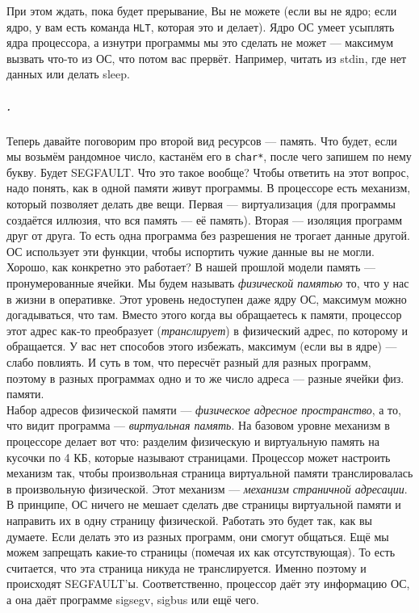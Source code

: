 \documentclass{article}
\newcommand{\asm}[1]{\texttt{#1}}
\begin{document}
    При этом ждать, пока будет прерывание, Вы не можете (если вы не ядро; если ядро, у вам есть команда \asm{HLT}, которая это и делает). Ядро ОС умеет усыплять ядра процессора, а изнутри программы мы это сделать не может --- максимум вызвать что-то из ОС, что потом вас прервёт. Например, читать из stdin, где нет данных или делать sleep.
    \subparagraph{.}
    Теперь давайте поговорим про второй вид ресурсов --- память. Что будет, если мы возьмём рандомное число, кастанём его в \texttt{char*}, после чего запишем по нему букву. Будет SEGFAULT. Что это такое вообще? Чтобы ответить на этот вопрос, надо понять, как в одной памяти живут программы. В процессоре есть механизм, который позволяет делать две вещи. Первая --- виртуализация (для программы создаётся иллюзия, что вся память --- её память). Вторая --- изоляция программ друг от друга. То есть одна программа без разрешения не трогает данные другой. ОС использует эти функции, чтобы испортить чужие данные вы не могли.\\
    Хорошо, как конкретно это работает? В нашей прошлой модели память --- пронумерованные ячейки. Мы будем называть \textit{физической памятью} то, что у нас в жизни в оперативке. Этот уровень недоступен даже ядру ОС, максимум можно догадываться, что там. Вместо этого когда вы обращаетесь к памяти, процессор этот адрес как-то преобразует (\textit{транслирует}) в физический адрес, по которому и обращается. У вас нет способов этого избежать, максимум (если вы в ядре) --- слабо повлиять. И суть в том, что пересчёт разный для разных программ, поэтому в разных программах одно и то же число адреса --- разные ячейки физ. памяти.\\
    Набор адресов физической памяти --- \textit{физическое адресное пространство}, а то, что видит программа --- \textit{виртуальная память}. На базовом уровне механизм в процессоре делает вот что: разделим физическую и виртуальную память на кусочки по 4 КБ, которые называют страницами. Процессор может настроить механизм так, чтобы произвольная страница виртуальной памяти транслировалась в произвольную физической. Этот механизм --- \textit{механизм страничной адресации}. В принципе, ОС ничего не мешает сделать две страницы виртуальной памяти и направить их в одну страницу физической. Работать это будет так, как вы думаете. Если делать это из разных программ, они смогут общаться. Ещё мы можем запрещать какие-то страницы (помечая их как отсутствующая). То есть считается, что эта страница никуда не транслируется. Именно поэтому и происходят SEGFAULT'ы. Соответственно, процессор даёт эту информацию ОС, а она даёт программе sigsegv, sigbus или ещё чего.\\
\end{document}
